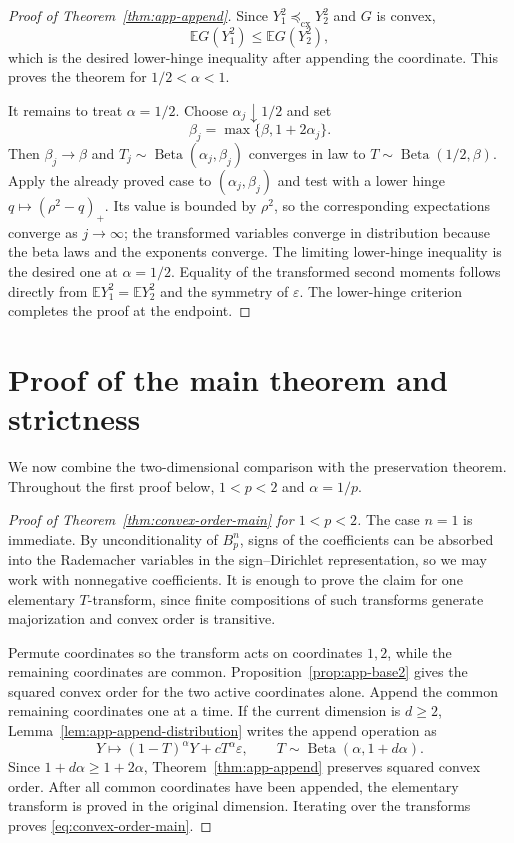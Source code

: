 \documentclass[pdflatex,sn-mathphys-num]{sn-jnl}
\numberwithin{equation}{section}
\theoremstyle{thmstyleone}
\theoremstyle{thmstylethree}
\newcommand{\E}{\mathbb{E}}
\newcommand{\1}{\mathbf{1}}
\newcommand{\eps}{\varepsilon}
\newcommand{\cx}{\preceq_{\mathrm{cx}}}
\begin{document}
\begin{proof}[Proof of Theorem~\ref{thm:app-append}]
Since $Y_1^2\cx Y_2^2$ and $G$ is convex,
\[
 \E G(Y_1^2)\le\E G(Y_2^2),
\]
which is the desired lower-hinge inequality after appending the coordinate.
This proves the theorem for $1/2<\alpha<1$.

It remains to treat $\alpha=1/2$. Choose $\alpha_j\downarrow1/2$ and
set
\[
 \beta_j=\max\{\beta,1+2\alpha_j\}.
\]
Then $\beta_j\to\beta$ and
$T_j\sim\operatorname{Beta}(\alpha_j,\beta_j)$ converges in law to
$T\sim\operatorname{Beta}(1/2,\beta)$. Apply the already proved case
to $(\alpha_j,\beta_j)$ and test with a lower hinge
$q\mapsto(\rho^2-q)_+$. Its value is bounded by $\rho^2$, so the
corresponding expectations converge as $j\to\infty$; the transformed
variables converge in distribution because the beta laws and the
exponents converge. The limiting lower-hinge inequality is the desired
one at $\alpha=1/2$. Equality of the transformed second moments follows
directly from $\E Y_1^2=\E Y_2^2$ and the symmetry of $\eps$. The
lower-hinge criterion completes the proof at the endpoint.
\end{proof}
\section{Proof of the main theorem and strictness}\label{sec:main-proof}

We now combine the two-dimensional comparison with the preservation
theorem. Throughout the first proof below, $1<p<2$ and
$\alpha=1/p$.

\begin{proof}[Proof of Theorem~\ref{thm:convex-order-main} for $1<p<2$]
The case $n=1$ is immediate. By unconditionality of $B_p^n$, signs of
the coefficients can be absorbed into the Rademacher variables in the
sign--Dirichlet representation, so we may work with nonnegative
coefficients. It is enough to prove the claim for one elementary
$T$-transform, since finite compositions of such transforms generate
majorization \cite[Ch.~2]{MarshallOlkinArnold} and convex order is
transitive.

Permute coordinates so the transform acts on coordinates $1,2$, while
the remaining coordinates are common. Proposition~\ref{prop:app-base2}
gives the squared convex order for the two active coordinates alone.
Append the common remaining coordinates one at a time. If the current
dimension is $d\ge2$, Lemma~\ref{lem:app-append-distribution} writes the
append operation as
\[
 Y\longmapsto(1-T)^\alpha Y+cT^\alpha\eps,
 \qquad
 T\sim\operatorname{Beta}(\alpha,1+d\alpha).
\]
Since $1+d\alpha\ge1+2\alpha$,
Theorem~\ref{thm:app-append} preserves squared convex order. After all
common coordinates have been appended, the elementary transform is
proved in the original dimension. Iterating over the transforms proves
\eqref{eq:convex-order-main}.
\end{proof}
\end{document}
